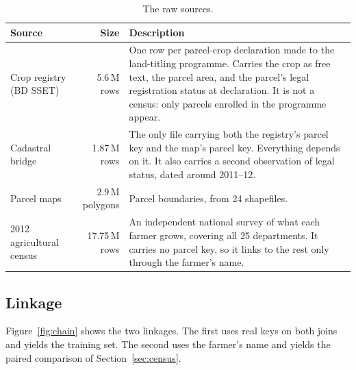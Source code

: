 \documentclass[11pt,a4paper]{article}
\begin{document}
\begin{table}[htbp]
\centering
\small
\caption{The raw sources.}
\label{tab:sources}
\begin{tabular}{@{}p{3.2cm}rp{9.6cm}@{}}
\toprule
\textbf{Source} & \textbf{Size} & \textbf{Description} \\
\midrule
Crop registry (BD SSET)
& 5.6\,M rows
& One row per parcel-crop declaration made to the land-titling programme. Carries the crop as
free text, the parcel area, and the parcel's legal registration status at declaration. It is not
a census: only parcels enrolled in the programme appear. \\[0.4em]

Cadastral bridge
& 1.87\,M rows
& The only file carrying both the registry's parcel key and the map's parcel key. Everything
depends on it. It also carries a second observation of legal status, dated around 2011--12. \\[0.4em]

Parcel maps
& 2.9\,M polygons
& Parcel boundaries, from 24 shapefiles. \\[0.4em]

2012 agricultural census
& 17.75\,M rows
& An independent national survey of what each farmer grows, covering all 25 departments. It
carries no parcel key, so it links to the rest only through the farmer's name. \\
\bottomrule
\end{tabular}
\end{table}

\subsection{Linkage}

Figure~\ref{fig:chain} shows the two linkages. The first uses real keys on both joins and yields
the training set. The second uses the farmer's name and yields the paired comparison of
Section~\ref{sec:census}.
\end{document}

